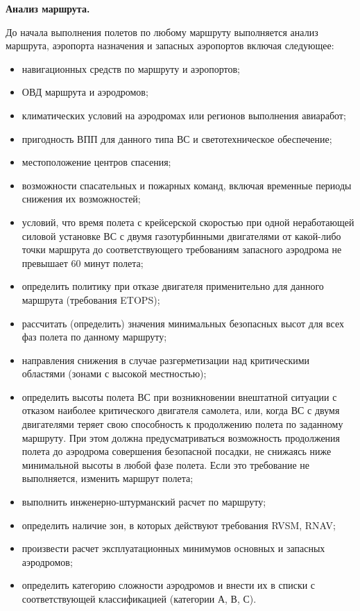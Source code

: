 \textbf{Анализ маршрута.}

До начала выполнения полетов по любому маршруту выполняется анализ маршрута, аэропорта назначения и запасных аэропортов включая следующее:

\begin{itemize}
    \item навигационных средств по маршруту и аэропортов;
    \item ОВД маршрута и аэродромов;
    \item климатических условий на аэродромах или регионов выполнения авиаработ;
    \item пригодность ВПП для данного типа ВС и светотехническое обеспечение;
    \item местоположение центров спасения;
    \item возможности спасательных и пожарных команд, включая временные периоды снижения их возможностей; 
    \item условий, что время полета с крейсерской скоростью при одной неработающей силовой установке ВС с двумя газотурбинными двигателями от какой-либо точки маршрута до соответствующего требованиям запасного аэродрома не превышает 60 минут полета;
    \item определить политику при отказе двигателя применительно для данного маршрута (требования ETOPS); 
    \item рассчитать (определить) значения минимальных безопасных высот для всех фаз полета по данному маршруту;
    \item направления снижения в случае разгерметизации над критическими областями (зонами с высокой местностью);
    \item определить высоты полета ВС при возникновении внештатной ситуации с отказом наиболее критического двигателя самолета, или, когда ВС с двумя двигателями теряет свою способность к продолжению полета по заданному маршруту. При этом должна предусматриваться возможность продолжения полета до аэродрома совершения безопасной посадки, не снижаясь ниже минимальной высоты в любой фазе полета. Если это требование не выполняется, изменить маршрут полета;
    \item выполнить инженерно-штурманский расчет по маршруту;
    \item определить наличие зон, в которых действуют требования RVSM, RNAV;
    \item произвести расчет эксплуатационных минимумов основных и запасных аэродромов;
    \item определить категорию сложности аэродромов и внести их в списки с соответствующей классификацией (категории А, В, С).
\end{itemize} 

